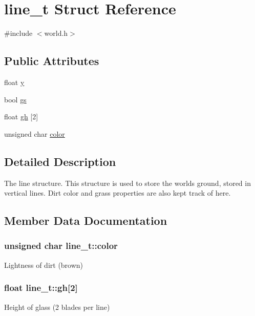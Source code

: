 \hypertarget{structline__t}{}\section{line\+\_\+t Struct Reference}
\label{structline__t}


{\ttfamily \#include $<$world.\+h$>$}

\subsection*{Public Attributes}
\begin{DoxyCompactItemize}
\item 
float \hyperlink{structline__t_a77fb44a40c2154411e5af6cf39194b30}{y}
\item 
bool \hyperlink{structline__t_a06568d82429331a242b9e6f45a36ae6d}{gs}
\item 
float \hyperlink{structline__t_a43341c3344f32533472fdd85c7e9e430}{gh} \mbox{[}2\mbox{]}
\item 
unsigned char \hyperlink{structline__t_a90c59d30a06d5c4bd7ee6c73c66fc414}{color}
\end{DoxyCompactItemize}


\subsection{Detailed Description}
The line structure. This structure is used to store the world\textquotesingle{}s ground, stored in vertical lines. Dirt color and grass properties are also kept track of here. 

\subsection{Member Data Documentation}
\hypertarget{structline__t_a90c59d30a06d5c4bd7ee6c73c66fc414}{}
\subsubsection[{color}]{\setlength{\rightskip}{0pt plus 5cm}unsigned char line\+\_\+t\+::color}\label{structline__t_a90c59d30a06d5c4bd7ee6c73c66fc414}
Lightness of dirt (brown) \hypertarget{structline__t_a43341c3344f32533472fdd85c7e9e430}{}
\subsubsection[{gh}]{\setlength{\rightskip}{0pt plus 5cm}float line\+\_\+t\+::gh\mbox{[}2\mbox{]}}\label{structline__t_a43341c3344f32533472fdd85c7e9e430}
Height of glass (2 blades per line) \hypertarget{structline__t_a06568d82429331a242b9e6f45a36ae6d}{}
